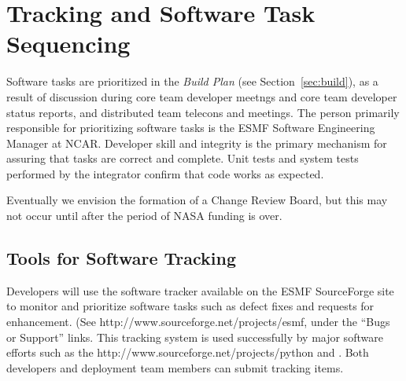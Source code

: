 
\section{Tracking and Software Task Sequencing}
\label{sec:tracking}

Software tasks are prioritized in the {\it Build Plan} 
(see Section~\ref{sec:build}), as
a result of discussion during core team developer meetngs and
core team developer status reports, and distributed team telecons and
meetings.  The person primarily responsible for prioritizing software
tasks is the ESMF Software Engineering Manager at NCAR.  Developer
skill and integrity is the primary mechanism for assuring that
tasks are correct and complete.  Unit tests and system tests 
performed by the integrator confirm that code works as expected.

Eventually we envision the formation of a Change Review Board,
but this may not occur until after the period of NASA funding is over.

\subsection{Tools for Software Tracking}
\label{sec:tracking_tools}

Developers will use the software tracker available on the ESMF 
SourceForge site to monitor and prioritize software tasks such as 
defect fixes and requests for enhancement.  
(See 
{http://www.sourceforge.net/projects/esmf}, under the ``Bugs or Support'' links.
This tracking system is used successfully by major software 
efforts such as the
 {http://www.sourceforge.net/projects/python}
and .
Both developers and deployment team members can submit tracking items.  

